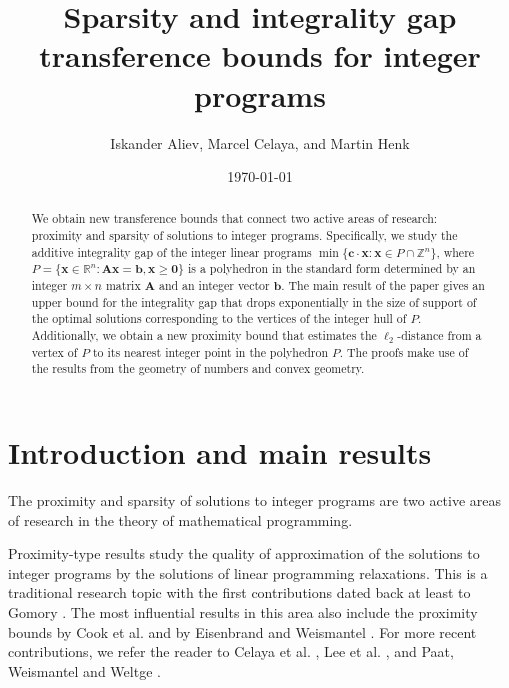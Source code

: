 \documentclass[runningheads]{llncs}
\title{Sparsity and integrality gap transference bounds for integer programs}
\author{Iskander Aliev\inst{1}, Marcel Celaya\inst{1}, and Martin Henk\inst{2}}
\institute{Cardiff University\\
\email{{\{alievi,celayam\}@cardiff.ac.uk}}
\and Technische Universit\"at Berlin\\
\email{henk@math.tu-berlin.de}
}
\date{\today }
\newcommand{\ve}{\boldsymbol}
\newcommand{\R}{\mathbb R}
\newcommand{\Z}{\mathbb Z}
\renewcommand\>{\rangle}
\newcommand\<{\langle}
\newcommand\0{\mathbf{0}}
\renewcommand\AA{\ve A}%
\begin{document}
\maketitle
\thispagestyle{plain}

\begin{abstract}
	\noindent
	We obtain new transference bounds that connect two active areas of research: proximity and sparsity of solutions to integer programs. Specifically, we study the additive integrality gap of the integer linear programs $\min\{{\ve c}\cdot{\ve x}: {\ve x}\in P\cap\Z^n\}$, where $P=\{{\ve x}\in\R^n: \AA{\ve x}={\ve b}, {\ve x}\ge {\ve 0}\}$ is a polyhedron in the standard form determined by an integer $m\times n$ matrix $\AA$ and an integer vector ${\ve b}$. The main result of the paper gives an upper bound for the integrality gap that drops exponentially in the size of support of the optimal solutions corresponding to the vertices of the integer hull of $P$. Additionally, we obtain a new proximity bound that estimates the $\ell_2$-distance from a vertex of $P$ to its nearest integer point in the polyhedron $P$. The proofs make use of the results from the geometry of numbers and convex geometry.


\end{abstract}



\section{Introduction and main results}

The proximity and sparsity of solutions to integer programs are two active areas of research in the theory of mathematical programming.


Proximity-type results study the quality of approximation of the solutions to integer programs by the solutions of linear programming relaxations. This is a traditional research topic with the first contributions dated back at least to Gomory \cite{Gomory_sensitivity,Gomory_polyhedra}. The most influential results in this area also include the proximity bounds by Cook et al. \cite{MR839604} and by Eisenbrand and Weismantel \cite{MR3775840}. For more recent contributions, we refer the reader to Celaya et al. \cite{CKPW}, Lee et al. \cite{LPSX,LPSX1}, and Paat, Weismantel and Weltge \cite{PWW}.
\end{document}

